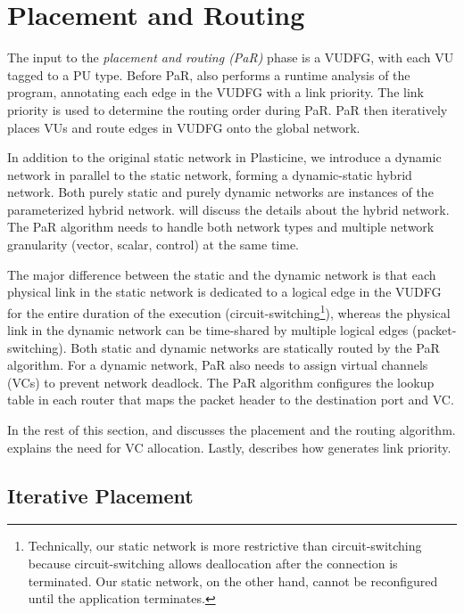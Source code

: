 \section{Placement and Routing} \label{sec:par}
The input to the \emph{placement and routing (PaR)} phase is a VUDFG, with each VU tagged to a PU
type.
Before PaR, \name also performs a runtime analysis of the program, annotating each edge in the VUDFG
with a link priority. The link priority is used to determine the routing order during PaR.
PaR then iteratively places VUs and route edges in VUDFG onto the global network.

In addition to the original static network in Plasticine, we introduce a dynamic network in
parallel to the static network, forming a dynamic-static hybrid network.
Both purely static and purely dynamic networks are instances of the parameterized hybrid network.
 will discuss the details about the hybrid network.
The PaR algorithm needs to handle both network types and multiple network granularity (vector,
scalar, control) at the same time.

The major difference between the static and the dynamic network is that each physical link in the static network is dedicated to a logical edge in the VUDFG for the entire duration of the execution
(circuit-switching\footnote{Technically, our static network is more restrictive than
circuit-switching because circuit-switching allows deallocation after the connection is terminated.
Our static network, on the other hand, cannot be reconfigured until the application terminates.}), whereas 
the physical link in the dynamic network can be time-shared by multiple logical edges
(packet-switching).
Both static and dynamic networks are statically routed by the PaR algorithm. 
For a dynamic network, PaR also needs to assign virtual channels (VCs) to prevent network deadlock.
The PaR algorithm configures the lookup table in each router that maps the packet header to the
destination port and VC.

In the rest of this section,  and  discusses the placement 
and the routing algorithm. 
 explains the need for VC allocation. 
Lastly,  describes how \name generates link priority.

\subsection{Iterative Placement} \label{sec:place}


